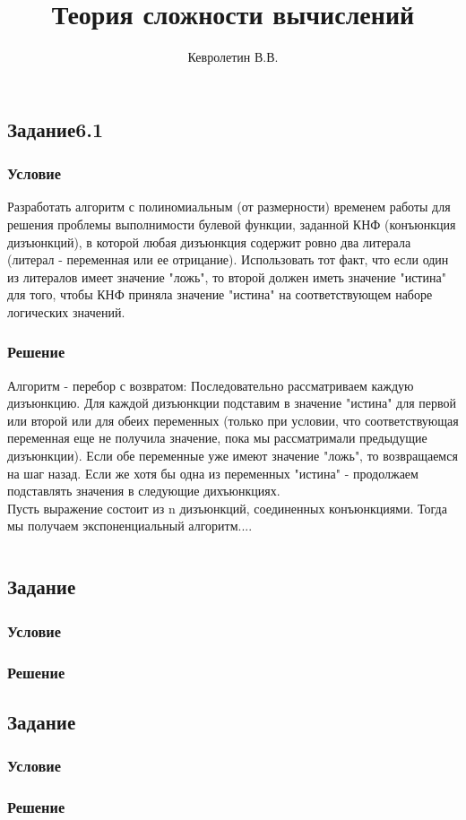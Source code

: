 \documentclass[10pt,a4paper]{article}
\author{Кевролетин В.В.}
\title{Теория сложности вычислений }
\begin{document}
\maketitle

\subsection*{Задание6.1}
\subsubsection*{Условие}
Разработать алгоритм с полиномиальным (от размерности) временем работы
для решения проблемы выполнимости булевой функции, заданной КНФ
(конъюнкция дизъюнкций), в которой любая дизъюнкция содержит ровно два
литерала (литерал - переменная или ее отрицание). Использовать тот
факт, что если один из литералов имеет значение "ложь", то второй
должен иметь значение "истина" для того, чтобы КНФ приняла значение
"истина" на соответствующем наборе логических значений. 
\subsubsection*{Решение}
Алгоритм - перебор с возвратом:
Последовательно рассматриваем каждую дизъюнкцию. Для каждой дизъюнкции
подставим в значение "истина" для первой или второй или для обеих
переменных (только при условии, что соответствующая переменная еще не
получила значение, пока мы рассматримали предыдущие дизъюнкции). Если
обе переменные уже имеют значение "ложь", то возвращаемся на шаг
назад. Если же хотя бы одна из переменных "истина" - продолжаем
подставлять значения в следующие дихъюнкциях. \\
Пусть выражение состоит из n дизъюнкций, соединенных
конъюнкциями. Тогда мы получаем экспоненциальный алгоритм....


\begin{lstlisting}
\end{lstlisting}


\subsection*{Задание}
\subsubsection*{Условие}
\subsubsection*{Решение}

\subsection*{Задание}
\subsubsection*{Условие}
\subsubsection*{Решение}
\end{document}
